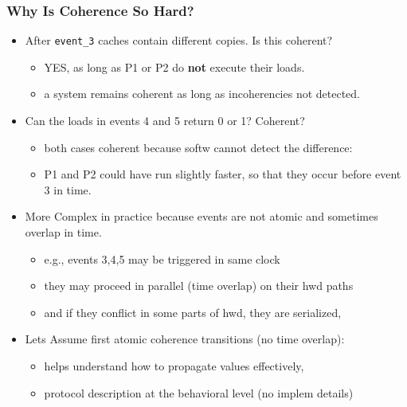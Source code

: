 \documentclass{beamer}
\begin{document}
\begin{frame}[fragile,t]
\frametitle{Why Is Coherence So Hard?}

\begin{itemize}
    \item After {\tt event\_3} caches contain different copies. Is this coherent?\smallskip
        \begin{itemize}
            \item YES, as long as P1 or P2 do {\bf not} execute their loads.
            \item a system remains coherent as long as incoherencies not detected.
        \end  {itemize}\bigskip

    \item Can the loads in events 4 and 5 return 0 or 1? Coherent?\smallskip
        \begin{itemize}
            \item both cases coherent because softw cannot detect the difference:
            \item P1 and P2 could have run slightly faster, so that they occur before event 3 in time.
        \end  {itemize}\medskip

    \item More Complex in practice because events are not atomic and sometimes overlap in time.\smallskip
        \begin{itemize}
            \item e.g., events 3,4,5 may be triggered in same clock
            \item they may proceed in parallel (time overlap)
                    on their hwd paths
            \item and if they conflict in some parts of hwd, they are serialized,
        \end  {itemize}\medskip

    \item Lets Assume first atomic coherence transitions (no time overlap):\smallskip
        \begin{itemize}
            \item helps understand how to propagate values effectively,
            \item protocol description at the behavioral level (no implem details)
        \end  {itemize}\medskip
\end{itemize}

\end{frame}
\end{document}
